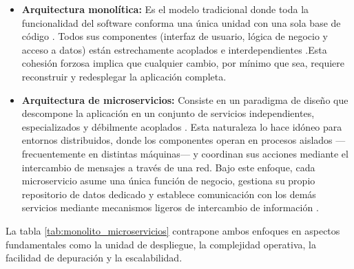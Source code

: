 \begin{itemize}
    \item \textbf{Arquitectura monolítica:} Es el modelo tradicional donde toda la funcionalidad del software conforma una única unidad con una sola base de código \cite{ibm_microservices_monolith}. Todos sus componentes (interfaz de usuario, lógica de negocio y acceso a datos) están estrechamente acoplados e interdependientes \cite{aws_monolith_microservices}.Esta cohesión forzosa implica que cualquier cambio, por mínimo que sea, requiere reconstruir y redesplegar la aplicación completa.
   
    \item \textbf{Arquitectura de microservicios:} Consiste en un paradigma de diseño que descompone la aplicación en un conjunto de servicios independientes, especializados y débilmente acoplados \cite{ibm_microservices_advantages}. 
    Esta naturaleza lo hace idóneo para entornos distribuidos, donde los componentes operan en procesos aislados —frecuentemente en distintas máquinas— y coordinan sus acciones mediante el intercambio de mensajes a través de una red.
    Bajo este enfoque, cada microservicio asume una única función de negocio, gestiona su propio repositorio de datos dedicado y establece comunicación con los demás servicios mediante mecanismos ligeros de intercambio de información \cite{aws_monolith_microservices,ibm_microservices_advantages}.

\end{itemize}

La tabla \ref{tab:monolito_microservicios} contrapone ambos enfoques en aspectos fundamentales como la unidad de despliegue, la complejidad operativa, la facilidad de depuración y la escalabilidad. 

